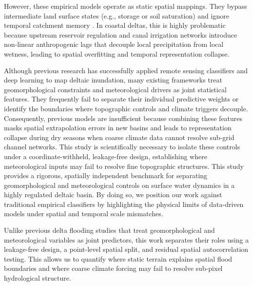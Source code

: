 \documentclass[12pt, a4paper]{article}
\begin{document}
However, these empirical models operate as static spatial mappings. They bypass intermediate land surface states (e.g., storage or soil saturation) and ignore temporal catchment memory \citep{Nearing2020What}. In coastal deltas, this is highly problematic because upstream reservoir regulation and canal irrigation networks introduce non-linear anthropogenic lags that decouple local precipitation from local wetness, leading to spatial overfitting and temporal representation collapse.

Although previous research has successfully applied remote sensing classifiers and deep learning to map deltaic inundation, many existing frameworks treat geomorphological constraints and meteorological drivers as joint statistical features. They frequently fail to separate their individual predictive weights or identify the boundaries where topographic controls and climate triggers decouple. Consequently, previous models are insufficient because combining these features masks spatial extrapolation errors in new basins and leads to representation collapse during dry seasons when coarse climate data cannot resolve sub-grid channel networks. This study is scientifically necessary to isolate these controls under a coordinate-withheld, leakage-free design, establishing where meteorological inputs may fail to resolve fine topographic structures. This study provides a rigorous, spatially independent benchmark for separating geomorphological and meteorological controls on surface water dynamics in a highly regulated deltaic basin. By doing so, we position our work against traditional empirical classifiers by highlighting the physical limits of data-driven models under spatial and temporal scale mismatches.

Unlike previous delta flooding studies that treat geomorphological and meteorological variables as joint predictors, this work separates their roles using a leakage-free design, a point-level spatial split, and residual spatial autocorrelation testing. This allows us to quantify where static terrain explains spatial flood boundaries and where coarse climate forcing may fail to resolve sub-pixel hydrological structure.
\end{document}
